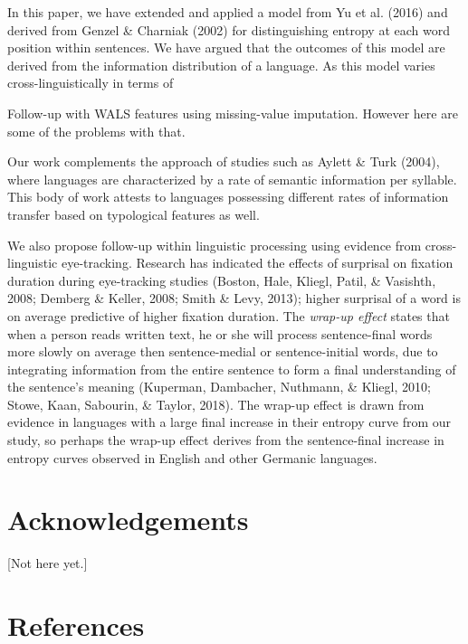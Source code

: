 \documentclass[10pt, letterpaper]{article}
\begin{document}
In this paper, we have extended and applied a model from Yu et al.
(2016) and derived from Genzel \& Charniak (2002) for distinguishing
entropy at each word position within sentences. We have argued that the
outcomes of this model are derived from the information distribution of
a language. As this model varies cross-linguistically in terms of

Follow-up with WALS features using missing-value imputation. However
here are some of the problems with that.

Our work complements the approach of studies such as Aylett \& Turk
(2004), where languages are characterized by a rate of semantic
information per syllable. This body of work attests to languages
possessing different rates of information transfer based on typological
features as well.

We also propose follow-up within linguistic processing using evidence
from cross-linguistic eye-tracking. Research has indicated the effects
of surprisal on fixation duration during eye-tracking studies (Boston,
Hale, Kliegl, Patil, \& Vasishth, 2008; Demberg \& Keller, 2008; Smith
\& Levy, 2013); higher surprisal of a word is on average predictive of
higher fixation duration. The \emph{wrap-up effect} states that when a
person reads written text, he or she will process sentence-final words
more slowly on average then sentence-medial or sentence-initial words,
due to integrating information from the entire sentence to form a final
understanding of the sentence's meaning (Kuperman, Dambacher, Nuthmann,
\& Kliegl, 2010; Stowe, Kaan, Sabourin, \& Taylor, 2018). The wrap-up
effect is drawn from evidence in languages with a large final increase
in their entropy curve from our study, so perhaps the wrap-up effect
derives from the sentence-final increase in entropy curves observed in
English and other Germanic languages.

\section{Acknowledgements}\label{acknowledgements}

{[}Not here yet.{]}

\section{References}\label{references}

\setlength{\parindent}{-0.1in} \setlength{\leftskip}{0.125in} \noindent
\end{document}
